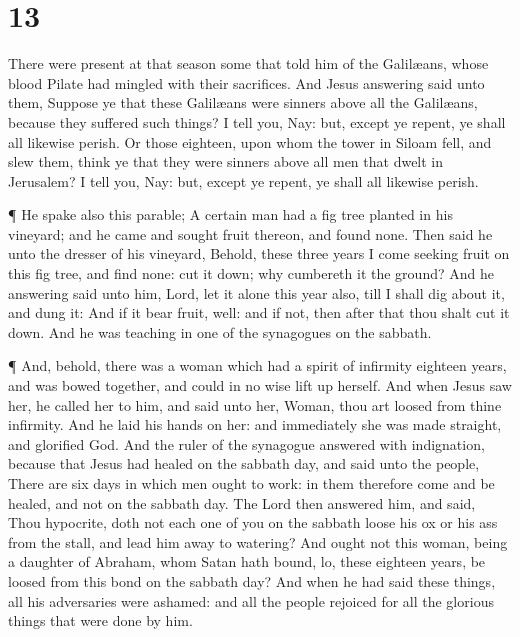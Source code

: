 \hypertarget{section-12}{%
\section{13}\label{section-12}}

 There were present at that season some that told him of the
Galilæans, whose blood Pilate had mingled with their sacrifices.
 And Jesus answering said unto them, Suppose ye that these
Galilæans were sinners above all the Galilæans, because they suffered
such things?  I tell you, Nay: but, except ye repent, ye
shall all likewise perish.  Or those eighteen, upon whom the
tower in Siloam fell, and slew them, think ye that they were sinners
above all men that dwelt in Jerusalem?  I tell you, Nay:
but, except ye repent, ye shall all likewise perish.

 ¶ He spake also this parable; A certain man had a fig tree
planted in his vineyard; and he came and sought fruit thereon, and found
none.  Then said he unto the dresser of his vineyard,
Behold, these three years I come seeking fruit on this fig tree, and
find none: cut it down; why cumbereth it the ground?  And he
answering said unto him, Lord, let it alone this year also, till I shall
dig about it, and dung it:  And if it bear fruit, well: and
if not, then after that thou shalt cut it down.  And he was
teaching in one of the synagogues on the sabbath.

 ¶ And, behold, there was a woman which had a spirit of
infirmity eighteen years, and was bowed together, and could in no wise
lift up herself.  And when Jesus saw her, he called her to
him, and said unto her, Woman, thou art loosed from thine infirmity.
 And he laid his hands on her: and immediately she was made
straight, and glorified God.  And the ruler of the
synagogue answered with indignation, because that Jesus had healed on
the sabbath day, and said unto the people, There are six days in which
men ought to work: in them therefore come and be healed, and not on the
sabbath day.  The Lord then answered him, and said, Thou
hypocrite, doth not each one of you on the sabbath loose his ox or his
ass from the stall, and lead him away to watering?  And
ought not this woman, being a daughter of Abraham, whom Satan hath
bound, lo, these eighteen years, be loosed from this bond on the sabbath
day?  And when he had said these things, all his
adversaries were ashamed: and all the people rejoiced for all the
glorious things that were done by him.

